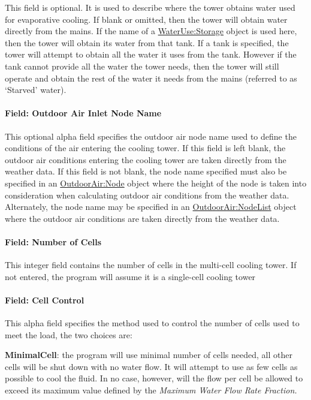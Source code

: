 This field is optional. It is used to describe where the tower obtains water used for evaporative cooling. If blank or omitted, then the tower will obtain water directly from the mains. If the name of a \hyperref[waterusestorage]{WaterUse:Storage} object is used here, then the tower will obtain its water from that tank. If a tank is specified, the tower will attempt to obtain all the water it uses from the tank. However if the tank cannot provide all the water the tower needs, then the tower will still operate and obtain the rest of the water it needs from the mains (referred to as `Starved' water).

\paragraph{Field: Outdoor Air Inlet Node Name}\label{field-outdoor-air-inlet-node-name-1}

This optional alpha field specifies the outdoor air node name used to define the conditions of the air entering the cooling tower. If this field is left blank, the outdoor air conditions entering the cooling tower are taken directly from the weather data. If this field is not blank, the node name specified must also be specified in an \hyperref[outdoorairnode]{OutdoorAir:Node} object where the height of the node is taken into consideration when calculating outdoor air conditions from the weather data. Alternately, the node name may be specified in an \hyperref[outdoorairnodelist]{OutdoorAir:NodeList} object where the outdoor air conditions are taken directly from the weather data.

\paragraph{Field: Number of Cells}\label{field-number-of-cells-1}

This integer field contains the number of cells in the multi-cell cooling tower. If not entered, the program will assume it is a single-cell cooling tower

\paragraph{Field: Cell Control}\label{field-cell-control-1}

This alpha field specifies the method used to control the number of cells used to meet the load, the two choices are:

\textbf{MinimalCell}: the program will use minimal number of cells needed, all other cells will be shut down with no water flow. It will attempt to use as few cells as possible to cool the fluid. In no case, however, will the flow per cell be allowed to exceed its maximum value defined by the \emph{Maximum Water Flow Rate Fraction.}

